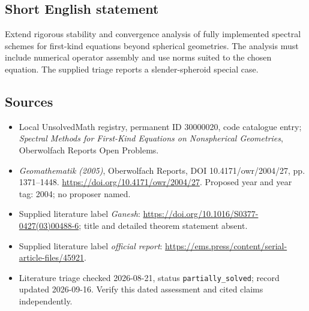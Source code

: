 \documentclass[11pt]{article}
\begin{document}
\subsection{Short English statement}
Extend rigorous stability and convergence analysis of fully implemented spectral schemes for first-kind equations beyond spherical geometries. The analysis must include numerical operator assembly and use norms suited to the chosen equation. The supplied triage reports a slender-spheroid special case.
\subsection{Sources}
\begin{itemize}\item Local UnsolvedMath registry, permanent ID 30000020, code catalogue entry; \emph{Spectral Methods for First-Kind Equations on Nonspherical Geometries}, Oberwolfach Reports Open Problems.\item \emph{Geomathematik (2005)}, Oberwolfach Reports, DOI 10.4171/owr/2004/27, pp. 1371--1448. \url{https://doi.org/10.4171/owr/2004/27}. Proposed year and year tag: 2004; no proposer named.\item Supplied literature label \emph{Ganesh}: \url{https://doi.org/10.1016/S0377-0427(03)00488-6}; title and detailed theorem statement absent.\item Supplied literature label \emph{official report}: \url{https://ems.press/content/serial-article-files/45921}.\item Literature triage checked 2026-08-21, status \texttt{partially\_solved}; record updated 2026-09-16. Verify this dated assessment and cited claims independently.\end{itemize}
\end{document}
